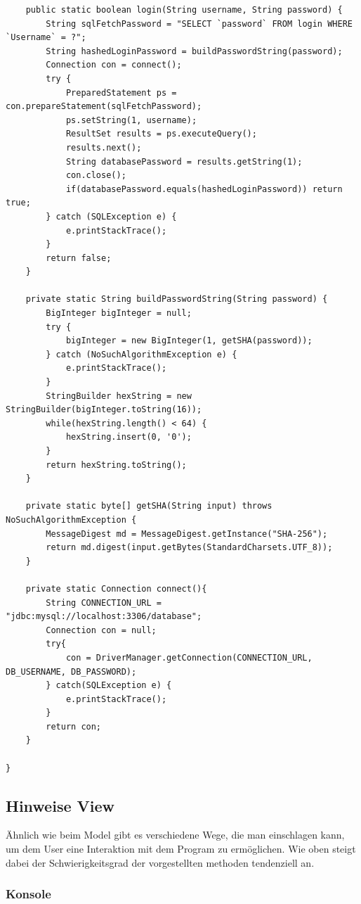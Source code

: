 \documentclass{article}
\begin{document}
\begin{verbatim}
    public static boolean login(String username, String password) {
        String sqlFetchPassword = "SELECT `password` FROM login WHERE `Username` = ?";
        String hashedLoginPassword = buildPasswordString(password);
        Connection con = connect();
        try {
            PreparedStatement ps = con.prepareStatement(sqlFetchPassword);
            ps.setString(1, username);
            ResultSet results = ps.executeQuery();
            results.next();
            String databasePassword = results.getString(1);
            con.close();
            if(databasePassword.equals(hashedLoginPassword)) return true; 
        } catch (SQLException e) {
            e.printStackTrace();
        }
        return false;
    } 

    private static String buildPasswordString(String password) {
        BigInteger bigInteger = null;
        try {
            bigInteger = new BigInteger(1, getSHA(password));
        } catch (NoSuchAlgorithmException e) {
            e.printStackTrace();
        }
        StringBuilder hexString = new StringBuilder(bigInteger.toString(16));
        while(hexString.length() < 64) {
            hexString.insert(0, '0');
        }
        return hexString.toString();
    }

    private static byte[] getSHA(String input) throws NoSuchAlgorithmException {
        MessageDigest md = MessageDigest.getInstance("SHA-256");
        return md.digest(input.getBytes(StandardCharsets.UTF_8));
    }
    
    private static Connection connect(){
        String CONNECTION_URL = "jdbc:mysql://localhost:3306/database";
        Connection con = null;
        try{
            con = DriverManager.getConnection(CONNECTION_URL, DB_USERNAME, DB_PASSWORD);
        } catch(SQLException e) {
            e.printStackTrace();
        }
        return con;
    }

}
\end{verbatim}


\subsection{Hinweise View}
\label{sec:hwView}
Ähnlich wie beim Model gibt es verschiedene Wege, die man einschlagen kann, um dem User eine Interaktion mit dem Program zu ermöglichen. Wie oben steigt dabei der Schwierigkeitsgrad der vorgestellten methoden tendenziell an. 

\subsubsection{Konsole}
\end{document}

